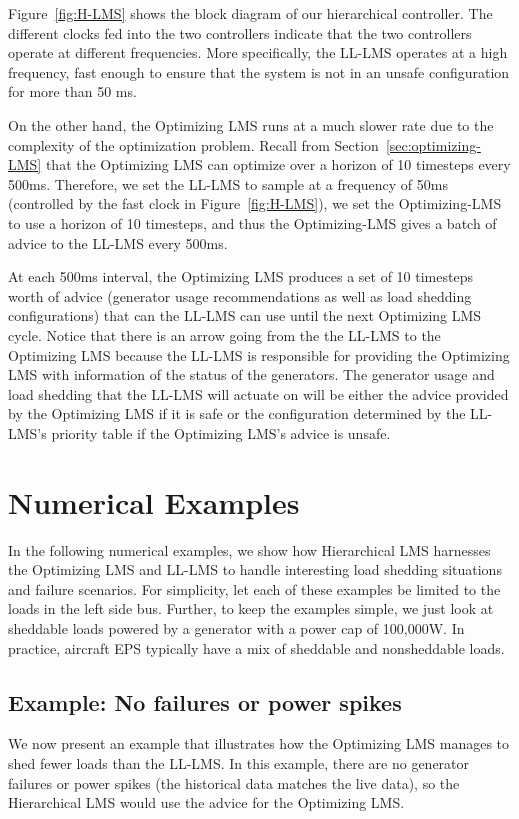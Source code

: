 \documentclass{acm_proc_article-sp}
\begin{document}
Figure~\ref{fig:H-LMS} shows the block diagram of our hierarchical controller. 
The different clocks fed into the two controllers indicate that the two controllers operate at different frequencies. 
More specifically, the LL-LMS operates at a high frequency, fast enough to ensure that the system is not in an unsafe configuration for more than 50 ms. 

On the other hand, the Optimizing LMS runs at a much slower rate due to the complexity of the optimization problem.
Recall from Section~\ref{sec:optimizing-LMS} that the Optimizing LMS can optimize over a horizon of 10 timesteps every 500ms. 
Therefore, we set the LL-LMS to sample at a frequency of 50ms (controlled by the fast clock in Figure~\ref{fig:H-LMS}), we set the Optimizing-LMS to use a horizon of 10 timesteps, and thus the Optimizing-LMS gives a batch of advice to the LL-LMS every 500ms.

At each 500ms interval, the Optimizing LMS produces a set of 10 timesteps worth of advice (generator usage recommendations as well as load shedding configurations) that can the LL-LMS can use until the next Optimizing LMS cycle. 
Notice that there is an arrow going from the the LL-LMS to the Optimizing LMS because the LL-LMS is responsible for providing the Optimizing LMS with information of the status of the generators. 
The generator usage and load shedding that the LL-LMS will actuate on will be either the advice provided by the Optimizing LMS
if it is safe or the configuration determined by the LL-LMS's priority table if the Optimizing LMS's advice is unsafe.

\section{Numerical Examples}
\label{sec:numerical-examples}
In the following numerical examples, we show how Hierarchical LMS harnesses the Optimizing LMS and LL-LMS to handle interesting load shedding situations and failure scenarios.
For simplicity, let each of these examples be limited to the loads in the left side bus.
Further, to keep the examples simple, we just look at sheddable loads powered by a generator with a power cap of 100,000W.
In practice, aircraft EPS typically have a mix of sheddable and nonsheddable loads.

\subsection{Example: No failures or power spikes}
We now present an example that illustrates how the Optimizing LMS manages to shed fewer loads than the LL-LMS. 
In this example, there are no generator failures or power spikes (the historical data matches the live data), so the Hierarchical LMS would use the advice for the Optimizing LMS.
\end{document}
